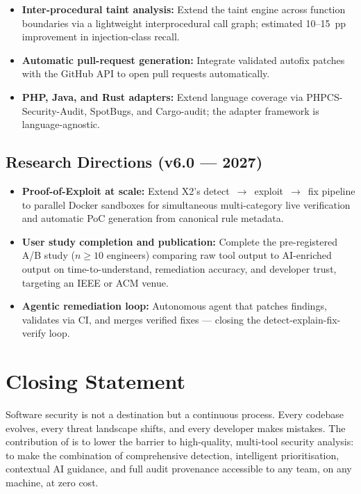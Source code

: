 \begin{itemize}
  \item \textbf{Inter-procedural taint analysis:} Extend the taint engine across function boundaries via a lightweight interprocedural call graph; estimated 10--15~pp improvement in injection-class recall.

  \item \textbf{Automatic pull-request generation:} Integrate validated autofix patches with the GitHub API \cite{owasp_api_top10} to open pull requests automatically.

  \item \textbf{PHP, Java, and Rust adapters:} Extend language coverage via PHPCS-Security-Audit, SpotBugs, and Cargo-audit; the adapter framework is language-agnostic.
\end{itemize}

\subsection{Research Directions (v6.0 --- 2027)}

\begin{itemize}
  \item \textbf{Proof-of-Exploit at scale:} Extend X2's detect~$\to$~exploit~$\to$~fix pipeline to parallel Docker sandboxes for simultaneous multi-category live verification and automatic PoC generation from canonical rule metadata.

  \item \textbf{User study completion and publication:} Complete the pre-registered A/B study ($n \geq 10$ engineers) comparing raw tool output to \ACRQA{} AI-enriched output on time-to-understand, remediation accuracy, and developer trust, targeting an IEEE or ACM venue.

  \item \textbf{Agentic remediation loop:} Autonomous agent that patches findings, validates via CI, and merges verified fixes --- closing the detect-explain-fix-verify loop.
\end{itemize}

\section{Closing Statement}

Software security is not a destination but a continuous process. Every codebase evolves, every threat landscape shifts, and every developer makes mistakes. The contribution of \ACRQA{} is to lower the barrier to high-quality, multi-tool security analysis: to make the combination of comprehensive detection, intelligent prioritisation, contextual AI guidance, and full audit provenance accessible to any team, on any machine, at zero cost.

